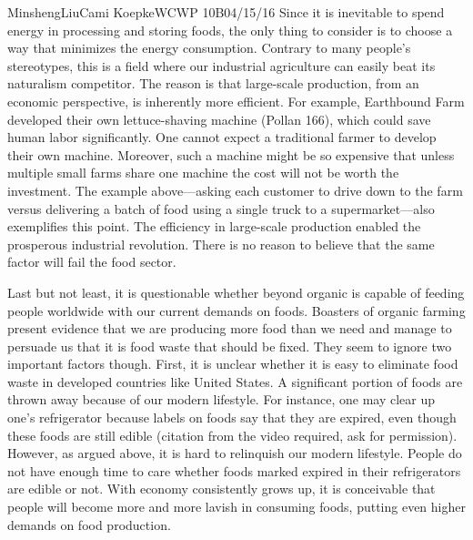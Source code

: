 \documentclass[12pt,letterpaper]{article}
\begin{document}
\begin{mla}{Minsheng}{Liu}{Cami Koepke}{WCWP 10B}{04/15/16}
Since it is inevitable to spend energy in processing and storing foods,
the only thing to consider is to choose a way that minimizes the energy
consumption. Contrary to many people's stereotypes, this is a field
where our industrial agriculture can easily beat its naturalism
competitor. The reason is that large-scale production, from an economic
perspective, is inherently more efficient. For example, Earthbound Farm
developed their own lettuce-shaving machine (Pollan 166), which could
save human labor significantly. One cannot expect a traditional farmer
to develop their own machine. Moreover, such a machine might be so
expensive that unless multiple small farms share one machine the cost
will not be worth the investment. The example above---asking each
customer to drive down to the farm versus delivering a batch of food
using a single truck to a supermarket---also exemplifies this point. The
efficiency in large-scale production enabled the prosperous industrial
revolution. There is no reason to believe that the same factor will fail
the food sector.

Last but not least, it is questionable whether beyond organic is capable
of feeding people worldwide with our current demands on foods. Boasters
of organic farming present evidence that we are producing more food than
we need and manage to persuade us that it is food waste that should be
fixed. They seem to ignore two important factors though. First, it is
unclear whether it is easy to eliminate food waste in developed
countries like United States. A significant portion of foods are thrown
away because of our modern lifestyle. For instance, one may clear up
one's refrigerator because labels on foods say that they are expired,
even though these foods are still edible (citation from the video
required, ask for permission). However, as argued above, it is hard to
relinquish our modern lifestyle. People do not have enough time to care
whether foods marked expired in their refrigerators are edible or not.
With economy consistently grows up, it is conceivable that people will
become more and more lavish in consuming foods, putting even higher
demands on food production.


\end{mla}
\end{document}

